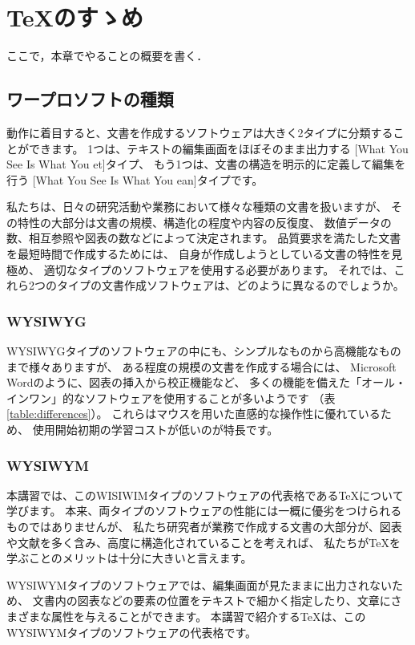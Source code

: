 \documentclass[TeXworkshop]{subfiles}
\begin{document}
\clearpage

\section{\TeX のすゝめ}
ここで，本章でやることの概要を書く．

\subsection{ワープロソフトの種類}
動作に着目すると、文書を作成するソフトウェアは大きく2タイプに分類することができます。
1つは、テキストの編集画面をほぼそのまま出力する
[What You See Is What You et]タイプ、
もう1つは、文書の構造を明示的に定義して編集を行う
 [What You See Is What You ean]タイプです。

私たちは、日々の研究活動や業務において様々な種類の文書を扱いますが、
その特性の大部分は文書の規模、構造化の程度や内容の反復度、
数値データの数、相互参照や図表の数などによって決定されます。
品質要求を満たした文書を最短時間で作成するためには、
自身が作成しようとしている文書の特性を見極め、
適切なタイプのソフトウェアを使用する必要があります。
それでは、これら2つのタイプの文書作成ソフトウェアは、どのように異なるのでしょうか。

\subsubsection{WYSIWYG}
WYSIWYGタイプのソフトウェアの中にも、シンプルなものから高機能なものまで様々ありますが、
ある程度の規模の文書を作成する場合には、
Microsoft Wordのように、図表の挿入から校正機能など、
多くの機能を備えた「オール・インワン」的なソフトウェアを使用することが多いようです
（表 \ref{table:differences}）。
これらはマウスを用いた直感的な操作性に優れているため、
使用開始初期の学習コストが低いのが特長です。


\subsubsection{WYSIWYM}
本講習では、このWISIWIMタイプのソフトウェアの代表格である\TeX について学びます。
本来、両タイプのソフトウェアの性能には一概に優劣をつけられるものではありませんが、
私たち研究者が業務で作成する文書の大部分が、図表や文献を多く含み、高度に構造化されていることを考えれば、
私たちが\TeX を学ぶことのメリットは十分に大きいと言えます。

WYSIWYMタイプのソフトウェアでは、編集画面が見たままに出力されないため、
文書内の図表などの要素の位置をテキストで細かく指定したり、文章にさまざまな属性を与えることができます。
本講習で紹介する\TeX は、このWYSIWYMタイプのソフトウェアの代表格です。
\end{document}
